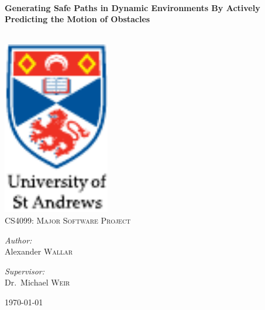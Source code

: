
\begin{titlepage}

\begin{center}

\HRule \\[0.4cm]
{ \huge \bfseries Generating Safe Paths in Dynamic Environments By Actively
Predicting the Motion of Obstacles\\[0.4cm] }

\HRule \\[3cm]


\includegraphics[width=0.35\textwidth]{figs/st-andrews-logo}~\\[1cm]

\textsc{\Large CS4099: Major Software Project}\\[1cm]

\noindent

\begin{minipage}{0.3\textwidth}

\begin{center} \large

\emph{Author:}\\

Alexander \textsc{Wallar}

\end{center}

\end{minipage}%
\begin{minipage}{0.3\textwidth}

\begin{center} \large

\emph{Supervisor:} \\

Dr.~Michael \textsc{Weir}

\end{center}

\end{minipage}%

\vfill

{\large \today}

\end{center}

\end{titlepage}
